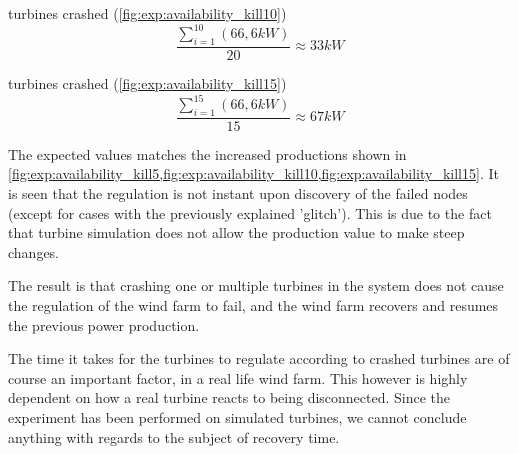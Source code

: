  turbines crashed (\cref{fig:exp:availability_kill10}) $$\frac{\sum\limits_{i=1}^{10}(66,6kW)}{20}\approx33kW$$

 turbines crashed (\cref{fig:exp:availability_kill15}) $$\frac{\sum\limits_{i=1}^{15}(66,6kW)}{15}\approx67kW$$

The expected values matches the increased productions shown in \cref{fig:exp:availability_kill5,fig:exp:availability_kill10,fig:exp:availability_kill15}.
It is seen that the regulation is not instant upon discovery of the failed nodes (except for cases with the previously explained 'glitch'). This is due to the fact that turbine simulation does not allow the production value to make steep changes.

The result is that crashing one or multiple turbines in the system does not cause the regulation of the wind farm to fail, and the wind farm recovers and resumes the previous power production.

The time it takes for the turbines to regulate according to crashed turbines are of course an important factor, in a real life wind farm.
This however is highly dependent on how a real turbine reacts to being disconnected.
Since the experiment has been performed on simulated turbines, we cannot conclude anything with regards to the subject of recovery time.

%
%

